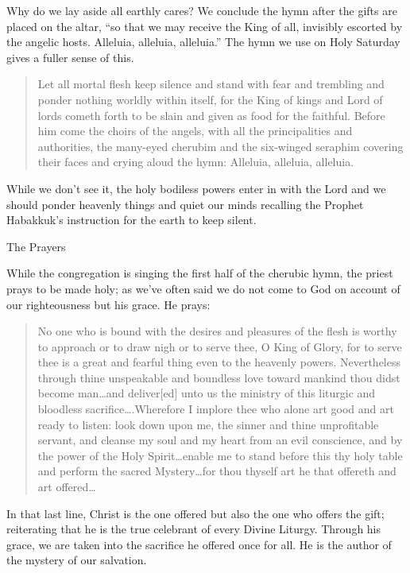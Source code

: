 \documentclass[
]{article}
\begin{document}
Why do we lay aside all earthly cares? We conclude the hymn after the
gifts are placed on the altar, ``so that we may receive the King of all,
invisibly escorted by the angelic hosts. Alleluia, alleluia, alleluia.''
The hymn we use on Holy Saturday gives a fuller sense of this.

\begin{quote}
Let all mortal flesh keep silence and stand with fear and trembling and
ponder nothing worldly within itself, for the King of kings and Lord of
lords cometh forth to be slain and given as food for the faithful.
Before him come the choirs of the angels, with all the principalities
and authorities, the many-eyed cherubim and the six-winged seraphim
covering their faces and crying aloud the hymn: Alleluia, alleluia,
alleluia.
\end{quote}

While we don't see it, the holy bodiless powers enter in with the Lord
and we should ponder heavenly things and quiet our minds recalling the
Prophet Habakkuk's instruction for the earth to keep silent.

The Prayers

While the congregation is singing the first half of the cherubic hymn,
the priest prays to be made holy; as we've often said we do not come to
God on account of our righteousness but his grace. He prays:

\begin{quote}
No one who is bound with the desires and pleasures of the flesh is
worthy to approach or to draw nigh or to serve thee, O King of Glory,
for to serve thee is a great and fearful thing even to the heavenly
powers. Nevertheless through thine unspeakable and boundless love toward
mankind thou didst become man\ldots and deliver{[}ed{]} unto us the
ministry of this liturgic and bloodless sacrifice\ldots.Wherefore I
implore thee who alone art good and art ready to listen: look down upon
me, the sinner and thine unprofitable servant, and cleanse my soul and
my heart from an evil conscience, and by the power of the Holy
Spirit\ldots enable me to stand before this thy holy table and perform
the sacred Mystery\ldots for thou thyself art he that offereth and art
offered\ldots{}
\end{quote}

In that last line, Christ is the one offered but also the one who offers
the gift; reiterating that he is the true celebrant of every Divine
Liturgy. Through his grace, we are taken into the sacrifice he offered
once for all. He is the author of the mystery of our salvation.
\end{document}
